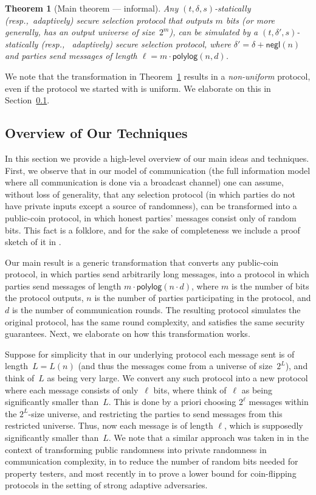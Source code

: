 \documentclass[11pt]{article}
\theoremstyle{plain}
\newtheorem{theorem}{Theorem}[section]
\theoremstyle{definition}
\numberwithin{equation}{section}
\numberwithin{equation}{section} \newcommand{\aka} {also known as\ }
\newcommand{\resp}{resp.,\ }
\newcommand{\1}{\mathbf{1}}
\newcommand{\negl}{{\mathsf{negl}}}
\newcommand{\polylog}{{\mathsf{polylog}}}
\theoremstyle{remark}
\begin{document}
\begin{theorem}[Main theorem --- informal]\label{lemma:many2few}
  Any $(t,\delta,s)$-statically (\resp adaptively) secure selection protocol
  that outputs $m$ bits (or more generally, has an output universe of
  size~$2^m$), can be simulated by a $(t,\delta',s)$-statically (\resp
  adaptively) secure selection protocol, where $\delta' = \delta + \negl(n)$ and
  parties send messages of length $\ell = m\cdot \polylog(n,d)$.
\end{theorem}

We note that the transformation in Theorem~\ref{lemma:many2few} results in a
\emph{non-uniform} protocol, even if the protocol we started with is uniform.
We elaborate on this in Section~\ref{sec:techniques}.


\subsection{Overview of Our Techniques}\label{sec:techniques}

In this section we provide a high-level overview of our main ideas and
techniques. First, we observe that in our model of communication (the full
information model where all communication is done via a broadcast channel) one
can assume, without loss of generality, that any selection protocol (in which
parties do not have private inputs except a source of randomness), can be
transformed into a public-coin protocol, in which honest parties' messages
consist only of random bits. This fact is a folklore, and for the sake of
completeness we include a proof sketch of it in .

Our main result is a generic transformation that converts any public-coin
protocol, in which parties send arbitrarily long messages, into a protocol in
which parties send messages of length $m\cdot \polylog(n\cdot d)$, where $m$ is the
number of bits the protocol outputs, $n$ is the number of parties participating
in the protocol, and $d$ is the number of communication rounds.  The resulting
protocol simulates the original protocol, has the same round complexity, and
satisfies the same security guarantees. Next, we elaborate on how this
transformation works.

Suppose for simplicity that in our underlying protocol each message sent is of
length~$L=L(n)$ (and thus the messages come from a universe of size~$2^L$), and
think of~$L$ as being very large.  We convert any such protocol into a new
protocol where each message consists of only~$\ell$ bits, where think of~$\ell$
as being significantly smaller than~$L$.  This is done by a priori choosing
$2^\ell$ messages within the $2^L$-size universe, and restricting the parties to
send messages from this restricted universe.  Thus, now each message is of
length $\ell$, which is supposedly significantly smaller than~$L$.  We note that
a similar approach was taken in \cite{Newman91} in the context of transforming
public randomness into private randomness in communication complexity, in
\cite{GoldreichS10} to reduce the number of random bits needed for property
testers, and most recently in \cite{GoldwasserKP15} to prove a lower bound for
coin-flipping protocols in the setting of strong adaptive adversaries.
\end{document}
